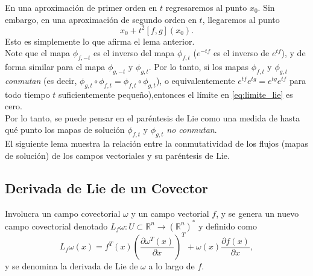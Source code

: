 En una aproximación de primer orden en $t$ regresaremos al punto $x_0$. Sin embargo, en una aproximación de segundo orden en $t$, llegaremos al punto
\begin{equation*}
	x_0 + t^2 \left[f,g\right](x_0).
\end{equation*}
Esto es simplemente lo que afirma el lema anterior.\\

Note que el mapa $\phi_{f, -t}$ es el inverso del mapa $\phi_{f,t}$ ($e^{-tf}$ es el inverso de $e^{tf}$), y de forma similar para el mapa $\phi_{g,-t}$ y $\phi_{g,t}$. Por lo tanto, si los mapas $\phi_{f,t}$ y $\phi_{g,t}$ \textit{conmutan} (es decir, $\phi_{g,t} \circ \phi_{f,t} = \phi_{f,t} \circ \phi_{g,t}$), o equivalentemente $e^{tf}e^{tg} = e^{tg}e^{tf}$ para todo tiempo $t$ suficientemente pequeño),entonces el límite en \eqref{eq:limite_lie} es cero.\\

Por lo tanto, se puede pensar en el paréntesis de Lie como una medida de hasta qué punto los mapas de solución $\phi_{f,t}$ y $\phi_{g,t}$ \textit{no conmutan}.\\

El siguiente lema muestra la relación entre la conmutatividad de los flujos (mapas de solución) de los campos vectoriales y su paréntesis de Lie.

\subsection{Derivada de Lie de un Covector}
Involucra un campo covectorial $\omega$ y un campo vectorial $f$, y se genera un nuevo campo covectorial denotado $L_f \omega: U \subset \mathbb{R}^n \rightarrow (\mathbb{R}^n)^*$ y definido como
\begin{equation*}
	L_f \omega(x) = f^T(x) \left( \dfrac{\partial \omega^T(x)}{\partial x} \right)^T + \omega(x)\dfrac{\partial f(x)}{\partial x},
\end{equation*}
y se denomina la derivada de Lie de $\omega$ a lo largo de $f$.\\


